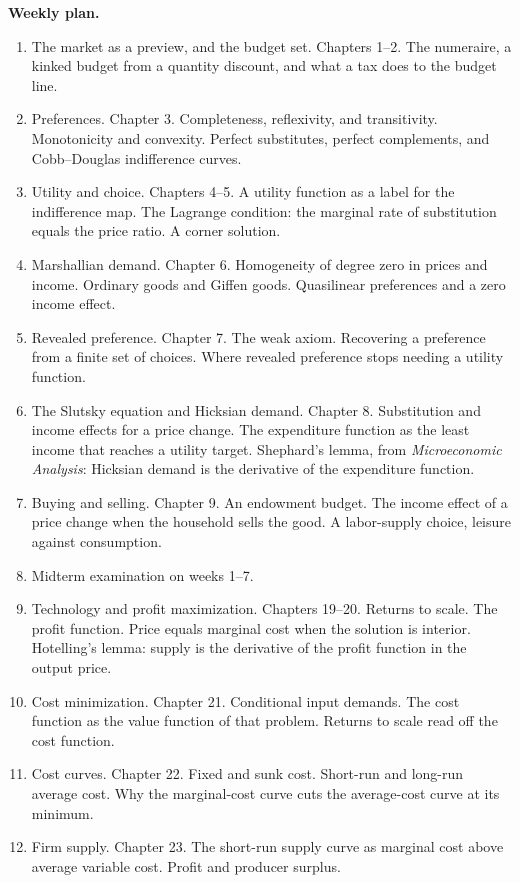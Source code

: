 \documentclass[11pt]{article}
\begin{document}
\textbf{Weekly plan.}
\begin{enumerate}
\item The market as a preview, and the budget set. Chapters 1--2. The numeraire, a kinked budget from a quantity discount, and what a tax does to the budget line.
\item Preferences. Chapter 3. Completeness, reflexivity, and transitivity. Monotonicity and convexity. Perfect substitutes, perfect complements, and Cobb--Douglas indifference curves.
\item Utility and choice. Chapters 4--5. A utility function as a label for the indifference map. The Lagrange condition: the marginal rate of substitution equals the price ratio. A corner solution.
\item Marshallian demand. Chapter 6. Homogeneity of degree zero in prices and income. Ordinary goods and Giffen goods. Quasilinear preferences and a zero income effect.
\item Revealed preference. Chapter 7. The weak axiom. Recovering a preference from a finite set of choices. Where revealed preference stops needing a utility function.
\item The Slutsky equation and Hicksian demand. Chapter 8. Substitution and income effects for a price change. The expenditure function as the least income that reaches a utility target. Shephard's lemma, from \emph{Microeconomic Analysis}: Hicksian demand is the derivative of the expenditure function.
\item Buying and selling. Chapter 9. An endowment budget. The income effect of a price change when the household sells the good. A labor-supply choice, leisure against consumption.
\item Midterm examination on weeks 1--7.
\item Technology and profit maximization. Chapters 19--20. Returns to scale. The profit function. Price equals marginal cost when the solution is interior. Hotelling's lemma: supply is the derivative of the profit function in the output price.
\item Cost minimization. Chapter 21. Conditional input demands. The cost function as the value function of that problem. Returns to scale read off the cost function.
\item Cost curves. Chapter 22. Fixed and sunk cost. Short-run and long-run average cost. Why the marginal-cost curve cuts the average-cost curve at its minimum.
\item Firm supply. Chapter 23. The short-run supply curve as marginal cost above average variable cost. Profit and producer surplus.

\end{enumerate}
\end{document}
